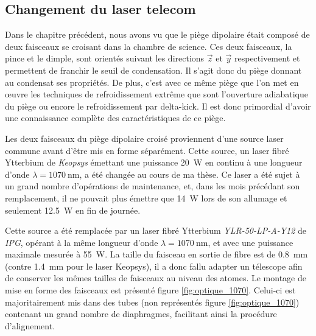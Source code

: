 \subsection{Changement du laser telecom}
Dans le chapitre précédent, nous avons vu que le piège dipolaire était composé de deux faisceaux se croisant dans la chambre de science. Ces deux faisceaux, la pince et le dimple, sont orientés suivant les directions $\vec{z}$ et $\vec{y}$ respectivement et permettent de franchir le seuil de condensation. Il s'agit donc du piège donnant au condensat ses propriétés. De plus, c'est avec ce même piège que l'on met en œuvre les techniques de refroidissement extrême que sont l'ouverture adiabatique du piège ou encore le refroidissement par delta-kick. Il est donc primordial d'avoir une connaissance complète des caractéristiques de ce piège.

Les deux faisceaux du piège dipolaire croisé proviennent d'une source laser commune avant d'être mis en forme séparément. Cette source, un laser fibré Ytterbium de \emph{Keopsys} émettant une puissance \SI{20}{\watt} en continu à une longueur d'onde $\lambda=\SI{1070}{\nano\metre}$, a été changée au cours de ma thèse. Ce laser a été sujet à un grand nombre d'opérations de maintenance, et, dans les mois précédant son remplacement, il ne pouvait plus émettre que \SI{14}{\watt} lors de son allumage et seulement \SI{12.5}{\watt} en fin de journée.
 
Cette source a été remplacée par un laser fibré Ytterbium \emph{YLR-50-LP-A-Y12} de \emph{IPG}, opérant à la même longueur d'onde $\lambda=\SI{1070}{\nano\metre}$, et avec une puissance maximale mesurée à \SI{55}{\watt}. La taille du faisceau en sortie de fibre est de \SI{0.8}{\milli\metre} (contre \SI{1.4}{\milli\metre} pour le laser Keopsys), il a donc fallu adapter un télescope afin de conserver les mêmes tailles de faisceaux au niveau des atomes. Le montage de mise en forme des faisceaux est présenté figure \ref{fig:optique_1070}. Celui-ci est majoritairement mis dans des tubes (non représentés figure \ref{fig:optique_1070}) contenant un grand nombre de diaphragmes, facilitant ainsi la procédure d'alignement.

